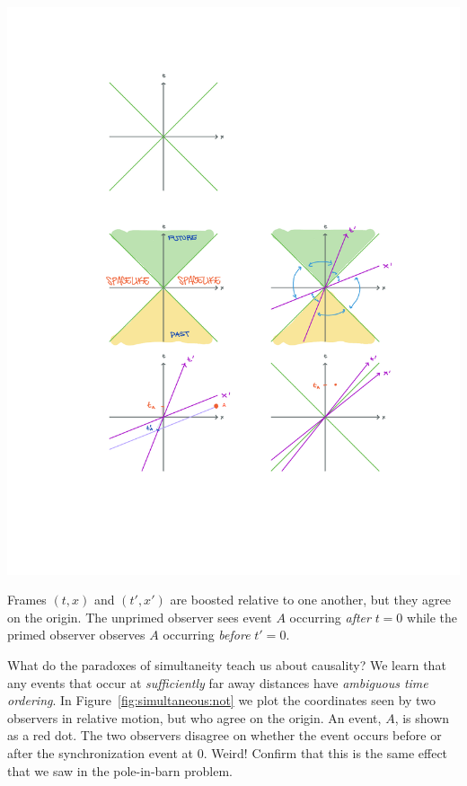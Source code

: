 \documentclass[12pt, oneside]{report}    %
\begin{document}
\begin{marginfigure}%
    \includegraphics[width=.8\textwidth]{figures/spacetime_simultaneity.pdf}
    \caption{Frames $(t,x)$ and $(t',x')$ are boosted relative to one another, but they agree on the origin. The unprimed observer sees event $A$ occurring \emph{after} $t=0$ while the primed observer observes $A$ occurring \emph{before} $t'=0$.}
    \label{fig:simultaneous:not}
\end{marginfigure}
What do the paradoxes of simultaneity teach us about causality? We learn that any events that occur at \emph{sufficiently} far away distances have \emph{ambiguous time ordering}. In Figure~\ref{fig:simultaneous:not} we plot the coordinates seen by two observers in relative motion, but who agree on the origin. An event, $A$, is shown as a red dot. The two observers disagree on whether the event occurs before or after the synchronization event at 0. Weird! Confirm that this is the same effect that we saw in the pole-in-barn problem.
\end{document}
